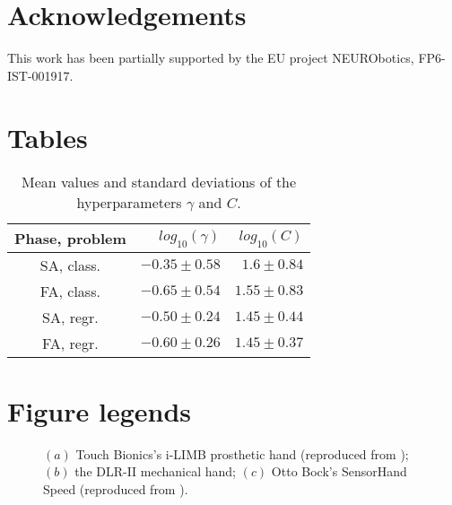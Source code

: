 \documentclass[10pt]{bmc_article}
\newenvironment{bmcformat}{\begin{raggedright}\baselineskip20pt\sloppy\setboolean{publ}{false}}{\end{raggedright}\baselineskip20pt\sloppy}
\begin{document}
\begin{bmcformat}
\section*{Acknowledgements}

This work has been partially supported by the EU project NEURObotics, FP6-IST-001917.

{
   }     %


\section*{Tables}

\begin{table}[!ht] \centering
  \caption{Mean values and standard deviations of the hyperparameters $\gamma$ and $C$.}
  \begin{tabular}{|c|r|r|}
    \hline
    Phase, problem & $log_{10}(\gamma)$ & $log_{10}(C)$ \\
    \hline
    SA, class.     & $-0.35 \pm 0.58$   & $1.6  \pm 0.84$ \\
    FA, class.     & $-0.65 \pm 0.54$   & $1.55 \pm 0.83$ \\
    SA, regr.      & $-0.50 \pm 0.24$   & $1.45 \pm 0.44$ \\
    FA, regr.      & $-0.60 \pm 0.26$   & $1.45 \pm 0.37$ \\
    \hline
  \end{tabular}
  \label{tab:hyp}
\end{table}

\section*{Figure legends}

\begin{figure}[!ht] \centering
  \caption{$(a)$ Touch Bionics's i-LIMB prosthetic hand (reproduced
    from \cite{ilimb}); $(b)$ the DLR-II mechanical hand; $(c)$ Otto
    Bock's SensorHand Speed (reproduced from \cite{sensorhand}).}
  \label{fig:hands}
\end{figure}


\end{bmcformat}
\end{document}
